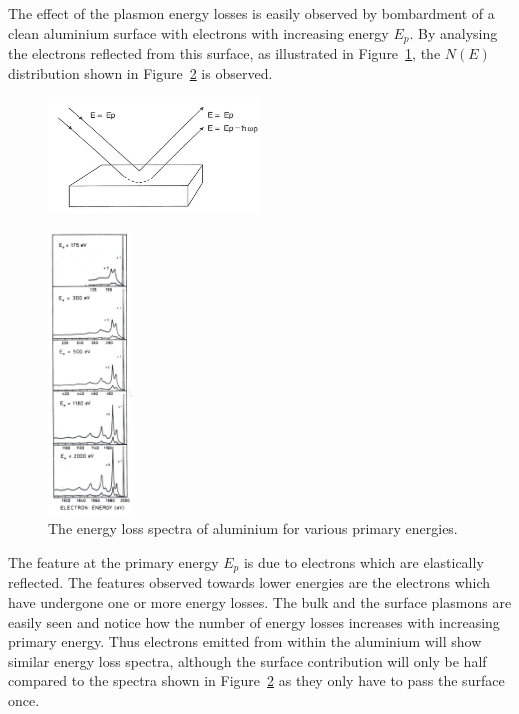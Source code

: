 The effect of the plasmon energy losses is easily observed by bombardment of a clean aluminium surface with electrons with increasing energy $E_{p}$. By analysing the electrons reflected from this surface, as illustrated in Figure~\ref{fig:plasmon_loss}, the $N(E)$ distribution shown in Figure~\ref{fig:plasmon_spectra} is observed.
\begin{figure}[htbp]
\centering
\includegraphics[width=0.5\textwidth]{figures/02_08}
\caption{ }
\label{fig:plasmon_loss}
\end{figure}

\begin{figure}[htbp]
\centering
\includegraphics[width=0.2\textwidth]{figures/02_09}
\caption{The energy loss spectra of aluminium for various primary energies.}
\label{fig:plasmon_spectra}
\end{figure}

The feature at the primary energy $E_{p}$ is due to electrons which are elastically reflected. The features observed towards lower energies are the electrons which have undergone one or more energy losses. The bulk and the surface plasmons are easily seen and notice how the number of energy losses increases with increasing primary energy. Thus electrons emitted from within the aluminium will show similar energy loss spectra, although the surface contribution will only be half compared to the spectra shown in Figure~\ref{fig:plasmon_spectra} as they only have to pass the surface once.

